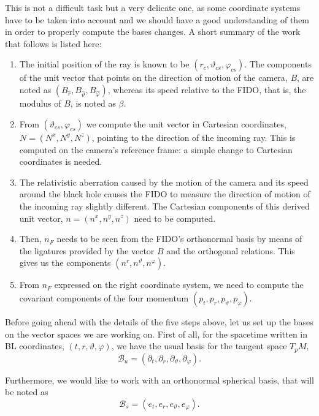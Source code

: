 This is not a difficult task but a very delicate one, as some coordinate systems have to be taken into account and we should have a good understanding of them in order to properly compute the bases changes. A short summary of the work that follows is listed here:
\begin{enumerate}
	\item The initial position of the ray is known to be $(r_c, \vartheta_{cs}, \varphi_{cs})$. The components of the unit vector that points on the direction of motion of the camera, $B$, are noted as $(B_{\widehat{r}}, B_{\widehat{\vartheta}}, B_{\widehat{\varphi}})$, whereas its speed relative to the \ac{FIDO}, that is, the modulus of $B$, is noted as $\beta$.
	\item From $(\vartheta_{cs}, \varphi_{cs})$ we compute the unit vector in Cartesian coordinates, $N = (N^x, N^y, N^z)$, pointing to the direction of the incoming ray. This is computed on the camera's reference frame: a simple change to Cartesian coordinates is needed.
	\item The relativistic aberration caused by the motion of the camera and its speed around the black hole causes the \ac{FIDO} to measure the direction of motion of the incoming ray slightly different. The Cartesian components of this derived unit vector, $n = (n^x, n^y, n^z)$ need to be computed.
	\item Then, $n_F$ needs to be seen from the \ac{FIDO}'s orthonormal basis by means of the ligatures provided by the vector $B$ and the orthogonal relations. This gives us the components $(n^r, n^\vartheta, n^\varphi)$.
	\item From $n_F$ expressed on the right coordinate system, we need to compute the covariant components of the four momentum $(p_t, p_r, p_\vartheta, p_\varphi)$.
\end{enumerate}

Before going ahead with the details of the five steps above, let us set up the bases on the vector spaces we are working on. First of all, for the spacetime written in \ac{BL} coordinates, $(t, r, \vartheta, \varphi)$, we have the usual basis for the tangent space $T_p M$,
\begin{equation}
	\mathcal{B}_u = (\partial_t, \partial_r, \partial_\vartheta, \partial_\varphi).
\end{equation}

Furthermore, we would like to work with an orthonormal spherical basis, that will be noted as
\begin{equation}
	\mathcal{B}_s = (e_t, e_r, e_\vartheta, e_\varphi).
\end{equation}


